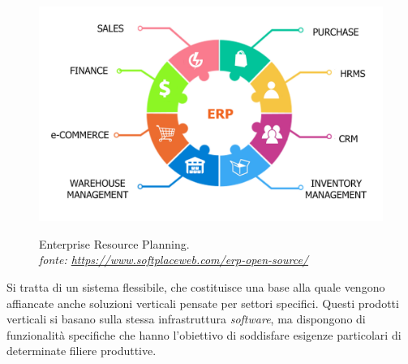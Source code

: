 \begin{figure}[H]
    \centering
    \includegraphics[alt={Enterprise Resource Planning}, width=1\columnwidth]{img/software-erp.png}
    \caption[Enterprise Resource Planning.]{Enterprise Resource Planning. \\ \textit{fonte: \url{https://www.softplaceweb.com/erp-open-source/}}}
    \label{fig:ERP}
\end{figure} 

Si tratta di un sistema flessibile, che costituisce una base alla quale vengono affiancate anche soluzioni verticali pensate per settori specifici. Questi prodotti verticali si basano sulla stessa infrastruttura \textit{software}, ma dispongono di funzionalità specifiche che hanno l'obiettivo di soddisfare esigenze particolari di determinate filiere produttive. \\


